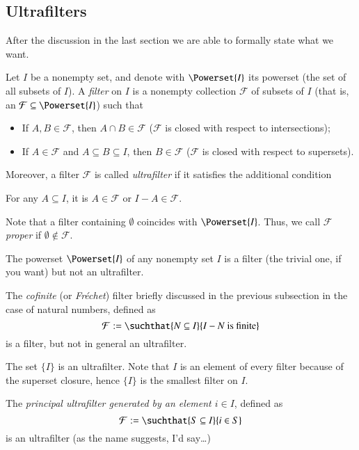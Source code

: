 \documentclass[adraft, copyright,creativecommons,sharealike,noncommercial]{eptcs}
\begin{document}
	\subsection{Ultrafilters}
	After the discussion in the last section we are able to formally state what we want.
	\begin{definition}
		Let $I$ be a nonempty set, and denote with $\Powerset{I}$ its powerset (the set of all subsets of $I$). A \emph{filter} on $I$ is a nonempty collection $\mathcal{F}$ of subsets of $I$ (that is, an $\mathcal{F} \subseteq \Powerset{I}$) such that
		\begin{itemize}
			\item If $A, B \in \mathcal{F}$, then $A \cap B \in \mathcal{F}$ ($\mathcal{F}$ is closed with respect to intersections);
			
			\item If $A \in \mathcal{F}$ and $A \subseteq B \subseteq I$, then $B \in \mathcal{F}$ ($\mathcal{F}$ is closed with respect to supersets).
		\end{itemize}
	Moreover, a filter $\mathcal{F}$ is called \emph{ultrafilter} if it satisfies the additional condition
	\begin{center}
		For any $A \subseteq I$, it is $A \in \mathcal{F}$ or $I-A \in \mathcal{F}$.
	\end{center}
	Note that a filter containing $\emptyset$ coincides with $\Powerset{I}$. Thus, we call $\mathcal{F}$ \emph{proper} if $\emptyset \not\in \mathcal{F}$.
	\end{definition}
\begin{example}
	The powerset $\Powerset{I}$ of any nonempty set $I$ is a filter (the trivial one, if you want) but not an ultrafilter.
\end{example}
\begin{example}
	The \emph{cofinite} (or \emph{Fr\'echet}) filter briefly discussed in the previous subsection in the case of natural numbers, defined as
	\begin{equation*}
	\mathcal{F}:=\suchthat{N \subseteq I}{I - N \text{ is finite}}
	\end{equation*}
	is a filter, but not in general an ultrafilter.
\end{example}
\begin{example}
	The set $\{I\}$ is an ultrafilter. Note that $I$ is an element of every filter because of the superset closure, hence $\{I\}$ is the smallest filter on $I$.
\end{example}
\begin{example}
	The \emph{principal ultrafilter generated by an element $i \in I$}, defined as
	\begin{equation*}
	\mathcal{F}:=\suchthat{S \subseteq I}{i \in S}
	\end{equation*}
	is an ultrafilter (as the name suggests, I'd say\dots)
\end{example}
\end{document}
